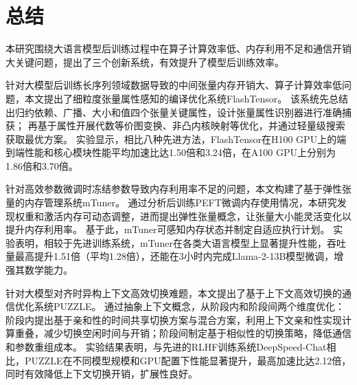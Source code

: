
\chapter{总结}

本研究围绕大语言模型后训练过程中在算子计算效率低、内存利用不足和通信开销大关键问题，提出了三个创新系统，有效提升了模型后训练效率。

针对大模型后训练长序列领域数据导致的中间张量内存开销大、算子计算效率低问题，本文提出了细粒度张量属性感知的编译优化系统FlashTensor。
该系统先总结出归约依赖、广播、大小和值四个张量关键属性，设计张量属性识别器进行准确捕获；
再基于属性开展代数等价图变换、非凸内核映射等优化，并通过轻量级搜索获取最优方案。
实验显示，相比八种先进方法，FlashTensor在H100 GPU上的端到端性能和核心模块性能平均加速比达1.50倍和3.24倍，在A100 GPU上分别为1.86倍和3.70倍。

针对高效参数微调时冻结参数导致内存利用率不足的问题，本文构建了基于弹性张量的内存管理系统mTuner。
通过分析后训练PEFT微调内存使用情况，本研究发现权重和激活内存可动态调整，进而提出弹性张量概念，让张量大小能灵活变化以提升内存利用率。
基于此，mTuner可感知内存状态并制定自适应执行计划。
实验表明，相较于先进训练系统，mTuner在各类大语言模型上显著提升性能，吞吐量最高提升1.51倍（平均1.28倍），还能在3小时内完成Llama-2-13B模型微调，增强其数学能力。

针对大模型对齐时异构上下文高效切换难题，本文提出了基于上下文高效切换的通信优化系统PUZZLE。
通过抽象上下文概念，从阶段内和阶段间两个维度优化：阶段内提出基于亲和性的时间共享切换方案与混合方案，利用上下文亲和性实现计算重叠，减少切换空闲时间与开销；阶段间制定基于相似性的切换策略，降低通信和参数重组成本。
实验结果表明，与先进的RLHF训练系统DeepSpeed-Chat相比，PUZZLE在不同模型规模和GPU配置下性能显著提升，最高加速比达2.12倍，同时有效降低上下文切换开销，扩展性良好。 







